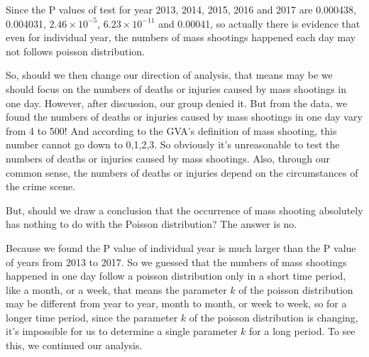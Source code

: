 \documentclass[12pt]{article}
\begin{document}
\par Since the P values of test for year 2013, 2014, 2015, 2016 and 2017 are 0.000438, 0.004031, $2.46\times10^{-5}$, $6.23\times 10^{-11}$ and 0.00041, so actually there is evidence that even for individual year, the numbers of mass shootings happened each day may not follows poisson distribution.
\par So, should we then change our direction of analysis, that means may be we should focus on the numbers of deaths or injuries caused by mass shootings in one day. However, after discussion, our group denied it. But from the data, we found the numbers of deaths or injuries caused by mass shootings in one day vary from 4 to 500! And according to the GVA's definition of mass shooting, this number cannot go down to 0,1,2,3. So obviously it's unreasonable to test the numbers of deaths or injuries caused by mass shootings. Also, through our common sense, the numbers of deaths or injuries depend on the circumstances of the crime scene.
\par But, should we draw a conclusion that the occurrence of mass shooting absolutely has nothing to do with the Poisson distribution? The answer is no.
\par Because we found the P value of individual year is much larger than the P value of years from 2013 to 2017. So we guessed that the numbers of mass shootings happened in one day follow a poisson distribution only in a short time period, like a month, or a week, that means the parameter $k$ of the poisson distribution may be different from year to year, month to month, or week to week, so for a longer time period, since the parameter $k$ of the poisson distribution is changing, it's impossible for us to determine a single parameter $k$ for a long period. To see this, we continued our analysis.
\newpage
\end{document}
